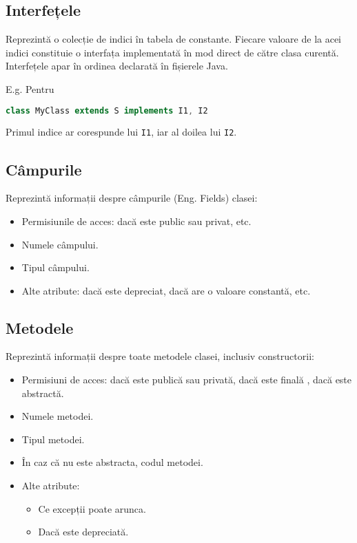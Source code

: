 \subsection{Interfețele}

Reprezintă o colecție de indici în tabela de constante. Fiecare valoare
de la acei indici constituie o interfața implementată în mod direct de
către clasa curentă. Interfețele apar în ordinea declarată în fișierele
Java.

E.g. Pentru

\begin{lstlisting}[language=Java]
class MyClass extends S implements I1, I2
\end{lstlisting}

Primul indice ar corespunde lui \texttt{I1}, iar al doilea lui
\texttt{I2}.

\subsection{Câmpurile}\label{campurile}

Reprezintă informații despre câmpurile (Eng. Fields) clasei:
\begin{itemize}
	\item Permisiunile de acces: dacă este public sau privat, etc.
	\item Numele câmpului.
	\item Tipul câmpului.
	\item Alte atribute: dacă este depreciat, dacă are o valoare constantă, etc.
\end{itemize}

\subsection{Metodele}\label{metodele}

Reprezintă informații despre toate metodele clasei, inclusiv
constructorii:

\begin{itemize}
	\item Permisiuni de acces: dacă este publică sau privată,
        dacă este finală , dacă este abstractă.
	\item Numele metodei.
	\item Tipul metodei.
	\item În caz că nu este abstracta, codul metodei.
	\item Alte atribute:
	      \begin{itemize}
		      \item Ce excepții poate arunca.
		      \item Dacă este depreciată.
	      \end{itemize}
\end{itemize}

